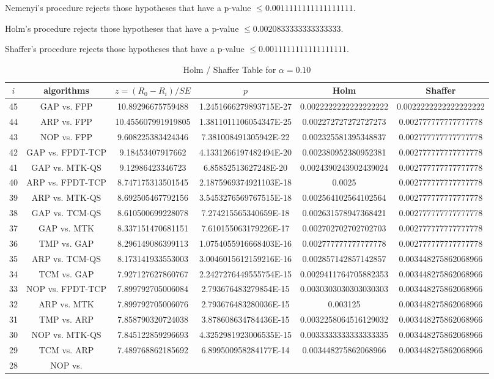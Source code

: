 \documentclass[a4paper,10pt]{article}
\begin{document}
\begin{landscape}
\begin{table}[!htp]
\begin{tabular}{cccccc}
\end{tabular}
\end{table}
Nemenyi's procedure rejects those hypotheses that have a p-value $\le0.0011111111111111111$.


Holm's procedure rejects those hypotheses that have a p-value $\le0.0020833333333333333$.


Shaffer's procedure rejects those hypotheses that have a p-value $\le0.0011111111111111111$.


\begin{table}[!htp]
\centering\tiny
\caption{Holm / Shaffer Table for $\alpha=0.10$}
\begin{tabular}{cccccc}
$i$&algorithms&$z=(R_0 - R_i)/SE$&$p$&Holm&Shaffer\\
\hline
45&GAP vs. FPP&10.89296675759488&1.2451666279893715E-27&0.0022222222222222222&0.0022222222222222222\\44&ARP vs. FPP&10.455607991919805&1.3811011106054347E-25&0.002272727272727273&0.002777777777777778\\43&NOP vs. FPP&9.608225383424346&7.381008491305942E-22&0.002325581395348837&0.002777777777777778\\42&GAP vs. FPDT-TCP&9.18453407917662&4.1331266197482494E-20&0.002380952380952381&0.002777777777777778\\41&GAP vs. MTK-QS&9.12986423346723&6.85852513627248E-20&0.0024390243902439024&0.002777777777777778\\40&ARP vs. FPDT-TCP&8.747175313501545&2.1875969374921103E-18&0.0025&0.002777777777777778\\39&ARP vs. MTK-QS&8.692505467792156&3.5453276569767515E-18&0.002564102564102564&0.002777777777777778\\38&GAP vs. TCM-QS&8.610500699228078&7.274215565340659E-18&0.002631578947368421&0.002777777777777778\\37&GAP vs. MTK&8.337151470681151&7.610155063179226E-17&0.002702702702702703&0.002777777777777778\\36&TMP vs. GAP&8.296149086399113&1.0754055916668403E-16&0.002777777777777778&0.002777777777777778\\35&ARP vs. TCM-QS&8.173141933553003&3.0046015612159216E-16&0.002857142857142857&0.003448275862068966\\34&TCM vs. GAP&7.927127627860767&2.2427276449555754E-15&0.0029411764705882353&0.003448275862068966\\33&NOP vs. FPDT-TCP&7.899792705006084&2.793676483279854E-15&0.0030303030303030303&0.003448275862068966\\32&ARP vs. MTK&7.899792705006076&2.793676483280036E-15&0.003125&0.003448275862068966\\31&TMP vs. ARP&7.858790320724038&3.878608634784436E-15&0.0032258064516129032&0.003448275862068966\\30&NOP vs. MTK-QS&7.845122859296693&4.3252981923006535E-15&0.0033333333333333335&0.003448275862068966\\29&TCM vs. ARP&7.489768862185692&6.899500958284177E-14&0.003448275862068966&0.003448275862068966\\28&NOP vs. 
\end{tabular}
\end{table}
\end{landscape}
\end{document}

